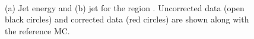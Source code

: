 \begin{figure}
\centering
\mbox{
              \quad
              \quad
}
\caption[Effect of additional calibration on the jet energy and \pt{} distributions for jets in the FCal]{
(a) Jet energy and (b) jet \pt{} for the region .
Uncorrected data (open black circles) and corrected data (red circles) are shown along with the reference MC. 
\label{JetPerf:E_PtData}}
\end{figure}

